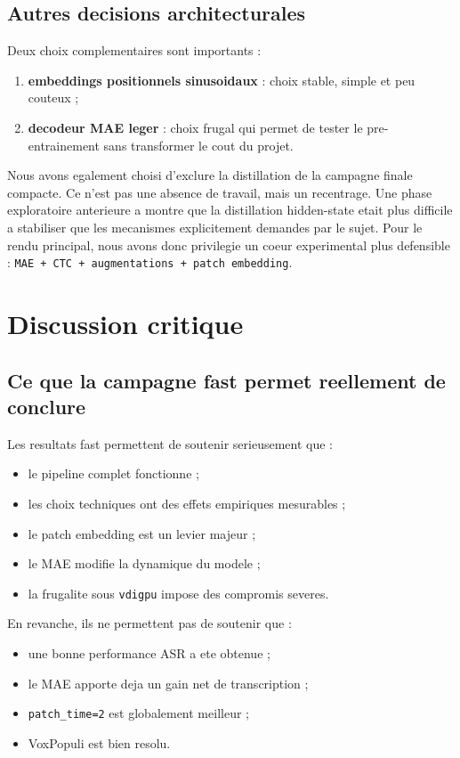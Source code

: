\documentclass[11pt,a4paper]{article}
\begin{document}
\subsection{Autres decisions architecturales}
Deux choix complementaires sont importants :
\begin{enumerate}[leftmargin=1.2cm]
\item \textbf{embeddings positionnels sinusoidaux} : choix stable, simple et peu couteux ;
\item \textbf{decodeur MAE leger} : choix frugal qui permet de tester le pre-entrainement sans transformer le cout du projet.
\end{enumerate}

Nous avons egalement choisi d'exclure la distillation de la campagne finale compacte. Ce n'est pas une absence de travail, mais un recentrage. Une phase exploratoire anterieure a montre que la distillation hidden-state etait plus difficile a stabiliser que les mecanismes explicitement demandes par le sujet. Pour le rendu principal, nous avons donc privilegie un coeur experimental plus defensible : \texttt{MAE + CTC + augmentations + patch embedding}.

\section{Discussion critique}
\subsection{Ce que la campagne fast permet reellement de conclure}
Les resultats fast permettent de soutenir serieusement que :
\begin{itemize}[leftmargin=1.2cm]
\item le pipeline complet fonctionne ;
\item les choix techniques ont des effets empiriques mesurables ;
\item le patch embedding est un levier majeur ;
\item le MAE modifie la dynamique du modele ;
\item la frugalite sous \texttt{vdigpu} impose des compromis severes.
\end{itemize}

En revanche, ils ne permettent pas de soutenir que :
\begin{itemize}[leftmargin=1.2cm]
\item une bonne performance ASR a ete obtenue ;
\item le MAE apporte deja un gain net de transcription ;
\item \texttt{patch\_time=2} est globalement meilleur ;
\item VoxPopuli est bien resolu.
\end{itemize}
\end{document}
